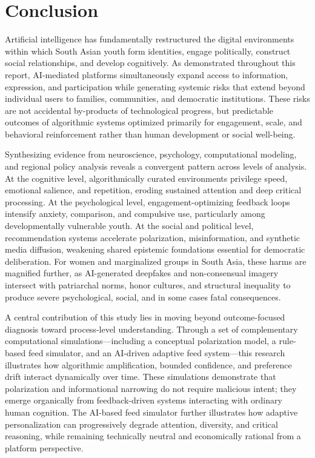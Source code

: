 \documentclass[12pt,a4paper]{report}
\begin{document}
\chapter{Conclusion}

Artificial intelligence has fundamentally restructured the digital environments within which South Asian youth form identities, engage politically, construct social relationships, and develop cognitively. As demonstrated throughout this report, AI-mediated platforms simultaneously expand access to information, expression, and participation while generating systemic risks that extend beyond individual users to families, communities, and democratic institutions. These risks are not accidental by-products of technological progress, but predictable outcomes of algorithmic systems optimized primarily for engagement, scale, and behavioral reinforcement rather than human development or social well-being.

Synthesizing evidence from neuroscience, psychology, computational modeling, and regional policy analysis reveals a convergent pattern across levels of analysis. At the cognitive level, algorithmically curated environments privilege speed, emotional salience, and repetition, eroding sustained attention and deep critical processing. At the psychological level, engagement-optimizing feedback loops intensify anxiety, comparison, and compulsive use, particularly among developmentally vulnerable youth. At the social and political level, recommendation systems accelerate polarization, misinformation, and synthetic media diffusion, weakening shared epistemic foundations essential for democratic deliberation. For women and marginalized groups in South Asia, these harms are magnified further, as AI-generated deepfakes and non-consensual imagery intersect with patriarchal norms, honor cultures, and structural inequality to produce severe psychological, social, and in some cases fatal consequences.

A central contribution of this study lies in moving beyond outcome-focused diagnosis toward process-level understanding. Through a set of complementary computational simulations—including a conceptual polarization model, a rule-based feed simulator, and an AI-driven adaptive feed system—this research illustrates how algorithmic amplification, bounded confidence, and preference drift interact dynamically over time. These simulations demonstrate that polarization and informational narrowing do not require malicious intent; they emerge organically from feedback-driven systems interacting with ordinary human cognition. The AI-based feed simulator further illustrates how adaptive personalization can progressively degrade attention, diversity, and critical reasoning, while remaining technically neutral and economically rational from a platform perspective.
\end{document}
